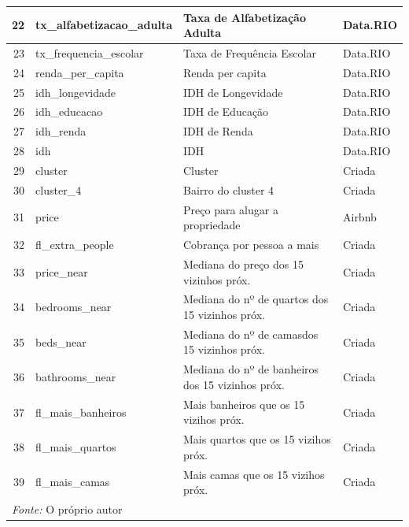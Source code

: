 \documentclass[
]{book}
\begin{document}
\begin{table}
\begin{tabular}[t]{r|l|l|l}
\hline
22 & tx\_alfabetizacao\_adulta & Taxa de Alfabetização Adulta & Data.RIO\\
\hline
23 & tx\_frequencia\_escolar & Taxa de Frequência Escolar & Data.RIO\\
\hline
24 & renda\_per\_capita & Renda per capita & Data.RIO\\
\hline
25 & idh\_longevidade & IDH de Longevidade & Data.RIO\\
\hline
26 & idh\_educacao & IDH de Educação & Data.RIO\\
\hline
27 & idh\_renda & IDH de Renda & Data.RIO\\
\hline
28 & idh & IDH & Data.RIO\\
\hline
29 & cluster & Cluster & Criada\\
\hline
30 & cluster\_4 & Bairro do cluster 4 & Criada\\
\hline
31 & price & Preço para alugar a propriedade & Airbnb\\
\hline
32 & fl\_extra\_people & Cobrança por pessoa a mais & Criada\\
\hline
33 & price\_near & Mediana do preço dos 15 vizinhos próx. & Criada\\
\hline
34 & bedrooms\_near & Mediana do nº de quartos dos 15 vizinhos próx. & Criada\\
\hline
35 & beds\_near & Mediana do nº de camasdos 15 vizinhos próx. & Criada\\
\hline
36 & bathrooms\_near & Mediana do nº de banheiros dos 15 vizinhos próx. & Criada\\
\hline
37 & fl\_mais\_banheiros & Mais banheiros que os 15 vizihos próx. & Criada\\
\hline
38 & fl\_mais\_quartos & Mais quartos que os 15 vizihos próx. & Criada\\
\hline
39 & fl\_mais\_camas & Mais camas que os 15 vizihos próx. & Criada\\
\hline
\multicolumn{4}{l}{\textit{Fonte: } O próprio autor}\\
\end{tabular}
\end{table}
\end{document}
